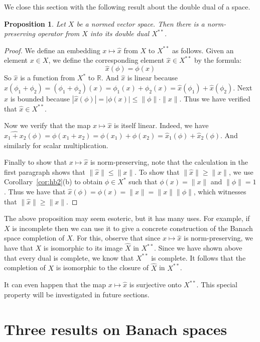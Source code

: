 \documentclass[11pt,oneside]{amsbook}
\newcommand{\RR}{{\mathbb R}}
\theoremstyle{definition}
\theoremstyle{plain}
\newtheorem{prop}[thm]{Proposition}
\theoremstyle{definition}
\theoremstyle{remark}
\numberwithin{equation}{section}
\numberwithin{figure}{section}
\begin{document}
We close this section with the following result about the double dual of a space.

\begin{prop}
  Let $X$ be a normed vector space. Then there is a norm-preserving operator from $X$ into its double dual $X^{**}$.
\end{prop}

\begin{proof}
  We define an embedding $x\mapsto\hat x$ from $X$ to $X^{**}$ as follows. Given an element $x\in X$, we define the corresponding element $\hat x\in X^{**}$ by the formula:
  \[\hat x(\phi)=\phi(x)
  \]
  So $\hat x$ is a function from $X^*$ to $\RR$. And $\hat x$ is linear because $\hat x(\phi_1+\phi_2)=(\phi_1+\phi_2)(x)=\phi_1(x)+\phi_2(x)=\hat x(\phi_1)+\hat x(\phi_2)$. Next $\hat x$ is bounded because $|\hat x(\phi)|=|\phi(x)|\leq\|\phi\|\cdot\|x\|$. Thus we have verified that $\hat x\in X^{**}$.

  Now we verify that the map $x\mapsto\hat x$ is itself linear. Indeed, we have $\widehat{x_1+x_2}(\phi)=\phi(x_1+x_2)=\phi(x_1)+\phi(x_2)=\hat x_1(\phi)+\hat x_2(\phi)$. And similarly for scalar multiplication.

  Finally to show that $x\mapsto\hat x$ is norm-preserving, note that the calculation in the first paragraph shows that $\|\hat x\|\leq\|x\|$. To show that $\|\hat x\|\geq\|x\|$, we use Corollary~\ref{cor:hb2}(b) to obtain $\phi\in X^*$ such that $\phi(x)=\|x\|$ and $\|\phi\|=1$. Thus we have that $\hat x(\phi)=\phi(x)=\|x\|=\|x\|\|\phi\|$, which witnesses that $\|\hat x\|\geq\|x\|$.
\end{proof}

The above proposition may seem esoteric, but it has many uses. For example, if $X$ is incomplete then we can use it to give a concrete construction of the Banach space completion of $X$. For this, observe that since $x\mapsto\hat x$ is norm-preserving, we have that $X$ is isomorphic to its image $\hat X$ in $X^{**}$. Since we have shown above that every dual is complete, we know that $X^{**}$ is complete. It follows that the completion of $X$ is isomorphic to the closure of $\hat X$ in $X^{**}$.

It can even happen that the map $x\mapsto\hat x$ is surjective onto $X^{**}$. This special property will be investigated in future sections.

\newpage
\section{Three results on Banach spaces}
\end{document}
